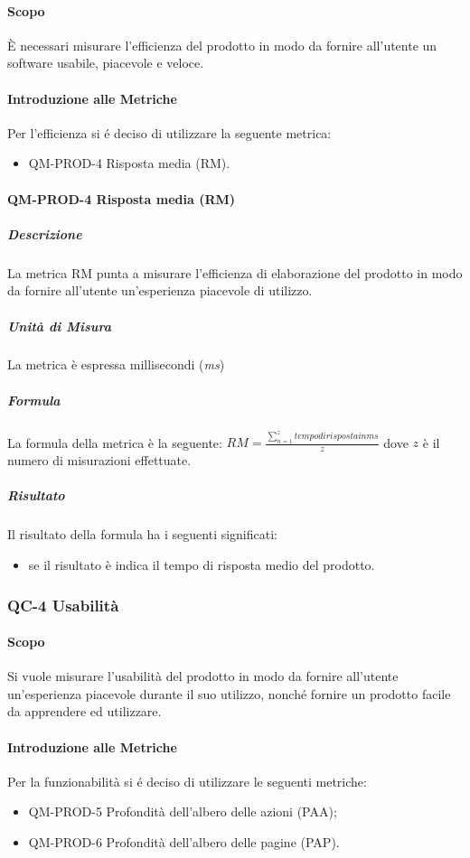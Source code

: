 		\paragraph{Scopo}
			È necessari misurare l'efficienza del prodotto in modo da fornire all'utente un software usabile, piacevole e veloce.
		\paragraph{Introduzione alle Metriche}
			Per l'efficienza si é deciso di utilizzare la seguente metrica:
			\begin{itemize}
				\item QM-PROD-4 Risposta media (RM).
			\end{itemize}
		\paragraph{QM-PROD-4 Risposta media (RM)}
			\subparagraph{Descrizione}
				La metrica RM punta a misurare l'efficienza di elaborazione del prodotto in modo da fornire all'utente un'esperienza piacevole di utilizzo.
			\subparagraph{Unità di Misura}
				La metrica è espressa millisecondi (\textit{ms})
			\subparagraph{Formula}
				La formula della metrica è la seguente:
				\(
					RM = \frac{\sum_{n=1}^{z} tempo di risposta in ms}{z}
				\)
				dove $z$ è il numero di misurazioni effettuate.
			\subparagraph{Risultato}
				Il risultato della formula ha i seguenti significati:
				\begin{itemize}
					\item se il risultato è indica il tempo di risposta medio del prodotto.
				\end{itemize}

	\subsubsection{QC-4 Usabilità}
		\paragraph{Scopo}
		Si vuole misurare l'usabilità del prodotto in modo da fornire all'utente un'esperienza piacevole durante il suo utilizzo, nonché fornire un prodotto facile da apprendere ed utilizzare.
		\paragraph{Introduzione alle Metriche}
			Per la funzionabilità si é deciso di utilizzare le seguenti metriche:
			\begin{itemize}
				\item QM-PROD-5 Profondità dell'albero delle azioni (PAA);
				\item QM-PROD-6 Profondità dell'albero delle pagine (PAP).
			\end{itemize}
